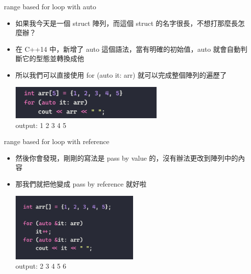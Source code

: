 \documentclass[aspectratio=169]{beamer}
\begin{document}
	\begin{frame}{range based for loop with auto}
		\begin{itemize}
			\item<1-> 如果我今天是一個 struct 陣列，而這個 struct 的名字很長，不想打那麼長怎麼辦？
			\item<2-> 在 C++14 中，新增了 auto 這個語法，當有明確的初始值，auto 就會自動判斷它的型態並轉換成他
			\item<3-> 所以我們可以直接使用 for (auto it: arr) 就可以完成整個陣列的遍歷了
			\begin{center}
				\includegraphics[width=0.6\textwidth]{./src/range_based_for_loop_2.png}\\
				output: 1 2 3 4 5
			\end{center}
		\end{itemize}
	\end{frame}

	\begin{frame}{range based for loop with reference}
		\begin{itemize}
			\item 然後你會發現，剛剛的寫法是 pass by value 的，沒有辦法更改到陣列中的內容
			\item 那我們就把他變成 pass by reference 就好啦
			\begin{center}
				\includegraphics[width=0.5\textwidth]{./src/range_based_for_loop_3.png}\\
				output: 2 3 4 5 6
			\end{center}
		\end{itemize}
	\end{frame}
\end{document}
